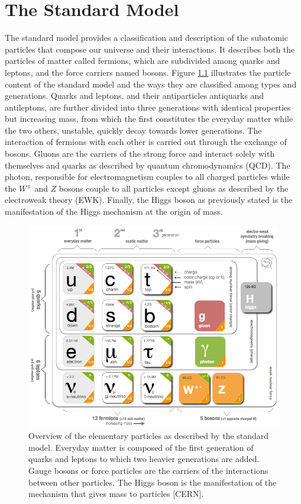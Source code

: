 
\chapter{The Standard Model}
\label{chap:I-1-standard-model}

  The standard model provides a classification and description of the subatomic particles that compose our universe and their interactions. It describes both the particles of matter called fermions, which are subdivided among quarks and leptons, and the force carriers named bosons. Figure \ref{fig:I-1-sm-particles} illustrates the particle content of the standard model and the ways they are classified among types and generations. Quarks and leptons, and their antiparticles antiquarks and antileptons, are further divided into three generations with identical properties but increasing mass, from which the first constitutes the everyday matter while the two others, unstable, quickly decay towards lower generations. The interaction of fermions with each other is carried out through the exchange of bosons. Gluons are the carriers of the strong force and interact solely with themselves and quarks as described by quantum chromodynamics (QCD). The photon, responsible for electromagnetism couples to all charged particles while the $ W^\pm $ and $ Z $ bosons couple to all particles except gluons as described by the electroweak theory (EWK). Finally, the Higgs boson as previously stated is the manifestation of the Higgs mechanism at the origin of mass. \\

	\begin{figure}[h!]
		\centering
		\includegraphics[width=\textwidth]{img/I-1-standard-model/sm-particles.png}
		\caption{Overview of the elementary particles as described by the standard model. Everyday matter is composed of the first generation of quarks and leptons to which two heavier generations are added. Gauge bosons or force particles are the carriers of the interactions between other particles. The Higgs boson is the manifestation of the mechanism that gives mass to particles [CERN].}
		\label{fig:I-1-sm-particles}
	\end{figure}


